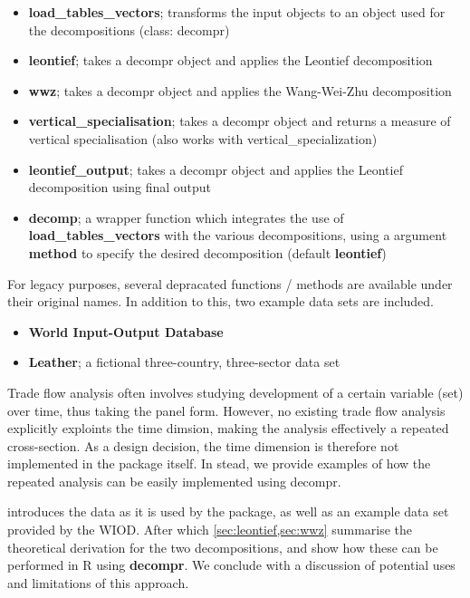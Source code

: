 \documentclass[a4paper]{article}\usepackage[]{graphicx}\usepackage[]{color}
\begin{document}
\begin{itemize}
 \item \textbf{load\_tables\_vectors}; transforms the input objects to an object used for the decompositions (class: decompr)
 \item \textbf{leontief}; takes a decompr object and applies the Leontief decomposition
 \item \textbf{wwz}; takes a decompr object and applies the Wang-Wei-Zhu decomposition
 \item \textbf{vertical\_specialisation}; takes a decompr object and returns a measure of vertical specialisation (also works with vertical\_specialization)
 \item \textbf{leontief\_output}; takes a decompr object and applies the Leontief decomposition using final output
 \item \textbf{decomp}; a wrapper function which integrates the use of \textbf{load\_tables\_vectors} with the various decompositions, using a argument \textbf{method} to specify the desired decomposition (default \textbf{leontief}) 
\end{itemize}

For legacy purposes, several depracated functions / methods are available under their original names.
In addition to this, two example data sets are included.

\begin{itemize}
  \item \textbf{World Input-Output Database} \parencite{timmer2012world}
  \item \textbf{Leather}; a fictional three-country, three-sector data set
\end{itemize}

Trade flow analysis often involves studying development of a certain variable (set) over time, thus taking the panel form.
However, no existing trade flow analysis explicitly exploints the time dimsion, making the analysis effectively a repeated cross-section.
As a design decision, the time dimension is therefore not implemented in the package itself.
In stead, we provide examples of how the repeated analysis can be easily implemented using decompr.

 introduces the data as it is used by the package, as well as an example data set provided by the WIOD.
After which \cref{sec:leontief,sec:wwz} summarise the theoretical derivation for the two decompositions, and show how these can be performed in R using \textbf{decompr}.
We conclude with a discussion of potential uses and limitations of this approach.
\end{document}
